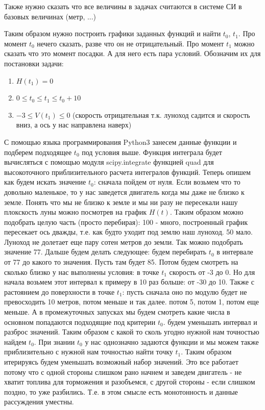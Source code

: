 \documentclass[12pt]{article}
\begin{document}
    Также нужно сказать что все величины в задачах считаются в системе СИ в базовых величинах
    (метр, ...)

    Таким образом нужно построить графики заданных функций и найти $t_0$, $t_1$. Про момент $t_0$
    нечего сказать, разве что он не отрицательный. Про момент $t_1$ можно сказать что это момент посадки.
    А для него есть пара условий. Обозначим их для постановки задачи:
    \begin{enumerate}
        \item $H(t_1) = 0$
        \item $0 \leq t_0 \leq t_1 \leq t_0 + 10$
        \item $-3 \leq V(t_1) \leq 0$ (скорость отрицательная т.к. луноход садится и скорость вниз,
        а ось у нас направлена наверх)
    \end{enumerate}

    С помощью языка программирования Python3 занесем данные функции и подберем подходящее 
    $t_0$ под условия выше. Функция интеграла будет вычисляться с помощью модуля
    scipy.integrate функцией quad для высокоточного приблизительного расчета интегралов функций.
    Теперь опишем как будем искать значение $t_0$: сначала пойдем от нуля. Если возьмем что то 
    довольно маленькое, то у нас заведется двигатель когда мы даже не близко к земле.
    Понять что мы не близко к земле и мы ни разу не пересекали нашу плокскость луны можно
    посмотрев на график $H(t)$. Таким образом можно подобрать целую часть (просто перебирая):
    100 - много, построенный график пересекает ось дважды, т.е. как будто уходит под землю
    наш луноход. 50 мало. Луноход не долетает еще пару сотен метров до земли. Так можно
    подобрать значение 77. Дальше будем делать следующее: будем перебирать $t_0$
    в интервале от 77 до какого то значения. Пусть там будет 85. Потом будем смотреть на сколько 
    близко у нас выполнены условия: в точке $t_1$ скорость от -3 до 0. Но для начала возьмем этот
    интервал к примеру в 10 раз больше: от -30 до 10. Также с растоянием до поверхности
    в точке $t_1$: пусть сначала оно по модулю будет не превосходить 10 метров, потом меньше и так далее.
    потом 5, потом 1, потом еще меньше. А в промежуточных запусках мы будем смотреть
    какие числа в основном попадаются подходящие под критерии $t_0$. будем
    уменьшать интервал и разброс значений. Таким образом с какой то сколь угодно нужной
    нам точностью найдем $t_0$. При знании $t_0$ у нас однозначно задаются функции и мы можем
    также приблизительно с нужной нам точностью найти точку $t_1$. Таким образом итерируясь
    будем уменьшать возможный набор значений. Это все работает потому что с одной стороны 
    слишком рано начнем и заведем двигатель - не хватит топлива для торможения и разобъемся,
    с другой стороны - если слишком поздно, то уже разбились. Т.е. в этом смысле есть монотонность 
    и данные рассуждения уместны. \\
\end{document}
